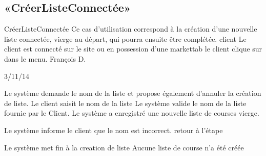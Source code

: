 \subsection{«CréerListeConnectée»}

\startCU
\nom CréerListeConnectée
\but Ce cas d’utilisation correspond à la création d’une nouvelle liste connectée, vierge au départ, qui pourra ensuite être complétée.
\acteur client
\precondition Le client est connecté sur le site ou en possession d'une markettab
\declenchement le client clique sur  dans le menu.
\auteur François D.
\date 03/11/14

\nominal %
\startnominal
{} Le système demande le nom de la liste et propose également d'annuler la création de liste.
 Le client saisit le nom de la liste
 Le système valide le nom de la liste fournie par le Client.
\stopnominal
\postcondition Le système a enregistré une nouvelle liste de courses vierge.

\alternatifs %
  \etape Le système informe le client que le nom est incorrect.
  \etape retour à l'étape 
\stopcondition
\stopalternatif

\exception %
  \etape Le système met fin à la creation de liste
\stopcondition
\postcondition Aucune liste de course n'a été créée
\stopalternatif
\stopCU
